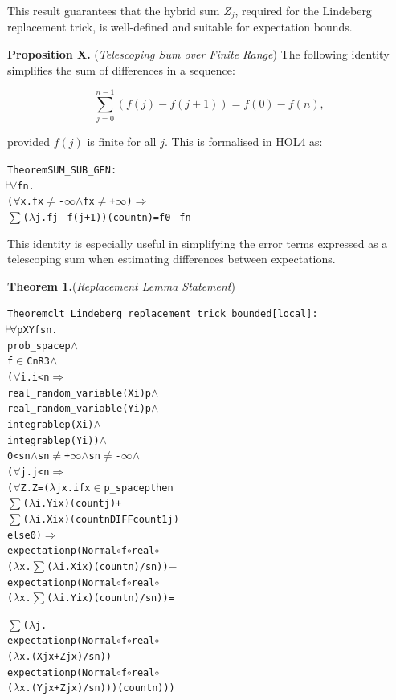 This result guarantees that the hybrid sum $Z_j$, required for the Lindeberg replacement trick, is well-defined and suitable for expectation bounds.

\textbf{Proposition X.} (\emph{Telescoping Sum over Finite Range})
The following identity simplifies the sum of differences in a sequence:

\[
\sum_{j = 0}^{n-1} \left( f(j) - f(j + 1) \right) = f(0) - f(n),
\]

provided $f(j)$ is finite for all $j$. This is formalised in HOL4 as:

\begin{hol}
\begin{alltt}
Theorem SUM\_SUB\_GEN :
\(\!\!\!{\turn}\!\!\!\!\) \(\forall\)f n.
(\(\forall\)x. f x \(\ne\) -\(\infty\) \(\land\) f x \(\ne\) +\(\infty\)) \(\Rightarrow\)
\(\sum\) (\(\lambda\)j. f j \({-}\) f (j + 1)) (count n) = f 0 \({-}\) f n
\end{alltt}
\end{hol}

This identity is especially useful in simplifying the error terms expressed as a telescoping sum when estimating differences between expectations.

\textbf{Theorem 1.}(\emph{Replacement Lemma Statement})

\begin{hol}
\begin{alltt}
Theorem clt\_Lindeberg\_replacement\_trick\_bounded[local] :
\(\!\!\!{\turn}\!\!\!\!\) \(\forall\)p X Y f s n.
prob\_space p \(\land\)
f \(\in\) CnR 3 \(\land\)
(\(\forall\)i. i < n \(\Rightarrow\)
  real\_random\_variable (X i) p \(\land\)
  real\_random\_variable (Y i) p \(\land\)
  integrable p (X i) \(\land\)
  integrable p (Y i)) \(\land\)
0 < s n \(\land\) s n \(\ne\) +\(\infty\) \(\land\) s n \(\ne\) -\(\infty\) \(\land\)
(\(\forall\)j. j < n \(\Rightarrow\)
  (\(\forall\)Z. Z = (\(\lambda\)j x. if x \(\in\) p\_space p then
                      \(\sum\) (\(\lambda\)i. Y i x) (count j) +
                      \(\sum\) (\(\lambda\)i. X i x) (count n DIFF count1 j)
                   else 0) \(\Rightarrow\)
    expectation p (Normal \(\circ\) f \(\circ\) real \(\circ\)
                   (\(\lambda\)x. \(\sum\) (\(\lambda\)i. X i x) (count n) / s n)) \({-}\)
    expectation p (Normal \(\circ\) f \(\circ\) real \(\circ\)
                   (\(\lambda\)x. \(\sum\) (\(\lambda\)i. Y i x) (count n) / s n)) =

    \(\sum\) (\(\lambda\)j.
      expectation p (Normal \(\circ\) f \(\circ\) real \(\circ\)
                     (\(\lambda\)x. (X j x + Z j x) / s n)) \({-}\)
      expectation p (Normal \(\circ\) f \(\circ\) real \(\circ\)
                     (\(\lambda\)x. (Y j x + Z j x) / s n))) (count n)))
\end{alltt}
\end{hol}

